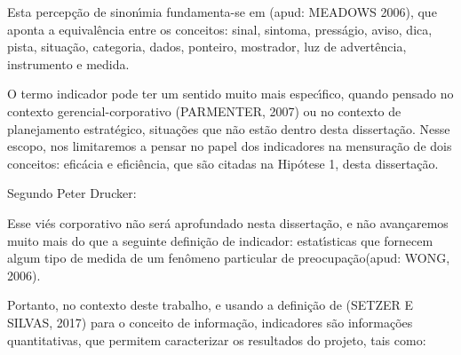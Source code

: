\documentclass[
12pt,		%
openright,	%
twoside,  %
a4paper,			%
chapter=TITLE,		%
english,			%
french,				%
spanish,			%
brazil				%
]{USPSC-classe/USPSC}
\begin{document}
Esta percep\c{c}\~ao de sinon\'{\i}mia fundamenta-se em (apud: MEADOWS 2006), que aponta a equival\^encia entre os conceitos: sinal, sintoma, press\'agio, aviso, dica, pista, situa\c{c}\~ao, categoria, dados, ponteiro, mostrador, luz de advert\^encia, instrumento e medida.









O termo \textquotedbl  indicador \textquotedbl  pode ter um sentido muito mais espec\'{\i}fico, quando pensado no contexto gerencial-corporativo (PARMENTER, 2007) ou no contexto de planejamento estrat\'egico, situa\c{c}\~oes que n\~ao est\~ao dentro desta disserta\c{c}\~ao. Nesse escopo, nos limitaremos a pensar no papel dos indicadores na mensura\c{c}\~ao de dois conceitos: efic\'acia e efici\^encia, que s\~ao citadas na Hip\'otese 1, desta disserta\c{c}\~ao.









Segundo Peter Drucker:










\noindent\begin{center}\mbox{\centering{}}\end{center}


Esse vi\'es corporativo n\~ao ser\'a aprofundado nesta disserta\c{c}\~ao, e n\~ao avan\c{c}aremos muito mais do que a seguinte defini\c{c}\~ao de indicador: \textquotedbl estat\'{\i}sticas que fornecem algum tipo de medida de um fen\^omeno particular de preocupa\c{c}\~ao\textquotedbl  (apud: WONG, 2006).









Portanto, no contexto deste trabalho, e usando a defini\c{c}\~ao de (SETZER E SILVAS, 2017) para o conceito de \textquotedbl informa\c{c}\~ao\textquotedbl , indicadores s\~ao informa\c{c}\~oes quantitativas, que permitem caracterizar os resultados do projeto, tais como:
\end{document}
